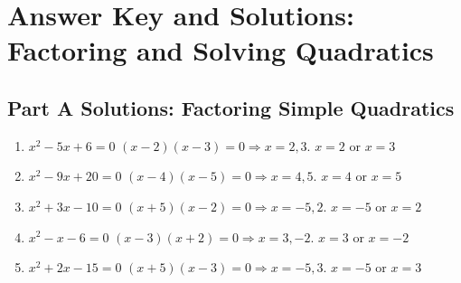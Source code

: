 \documentclass[12pt]{article}
\begin{document}

\section*{Answer Key and Solutions: Factoring and Solving Quadratics}

\subsection*{Part A Solutions: Factoring Simple Quadratics}
\begin{enumerate}
  \item \(x^2 - 5x + 6 = 0\)  
  \((x - 2)(x - 3) = 0 \Rightarrow x = 2, 3.\)  
  \(\boxed{x = 2 \text{ or } x = 3}\)

  \item \(x^2 - 9x + 20 = 0\)  
  \((x - 4)(x - 5) = 0 \Rightarrow x = 4, 5.\)  
  \(\boxed{x = 4 \text{ or } x = 5}\)

  \item \(x^2 + 3x - 10 = 0\)  
  \((x + 5)(x - 2) = 0 \Rightarrow x = -5, 2.\)  
  \(\boxed{x = -5 \text{ or } x = 2}\)

  \item \(x^2 - x - 6 = 0\)  
  \((x - 3)(x + 2) = 0 \Rightarrow x = 3, -2.\)  
  \(\boxed{x = 3 \text{ or } x = -2}\)

  \item \(x^2 + 2x - 15 = 0\)  
  \((x + 5)(x - 3) = 0 \Rightarrow x = -5, 3.\)  
  \(\boxed{x = -5 \text{ or } x = 3}\)
\end{enumerate}
\end{document}
